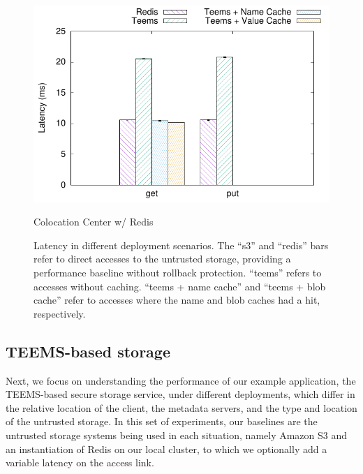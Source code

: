 \begin{figure}[t]
    \begin{minipage}[t]{0.50\linewidth}
        \centering
        \includegraphics[width=\linewidth]{teem_results/deployment/result/collocation_center}
        \caption{Colocation Center w/ Redis}\label{fig:coloc_redis}
    \end{minipage}
    \caption{Latency in different deployment scenarios. The
    ``s3'' and ``redis'' bars refer to direct accesses to the
    untrusted storage, providing a performance baseline without
    rollback protection. ``teems'' refers to accesses without
    caching. ``teems + name cache'' and ``teems +
    blob cache'' refer to accesses where the name and blob
    caches had a hit, respectively.}
\end{figure}



\subsection{\ac{TEEMS}-based storage}\label{ssec:eval_deploy}
Next, we focus on understanding the performance of our example
application, the  \ac{TEEMS}-based secure storage service, under
different deployments, which differ in the relative location of
the client, the metadata servers, and the type and location of
the untrusted storage. In this set of experiments, our baselines
are the untrusted
storage systems being used in each situation, namely Amazon S3 and an
instantiation of Redis on our local cluster, to which we optionally
add a variable  latency on the
access link.

